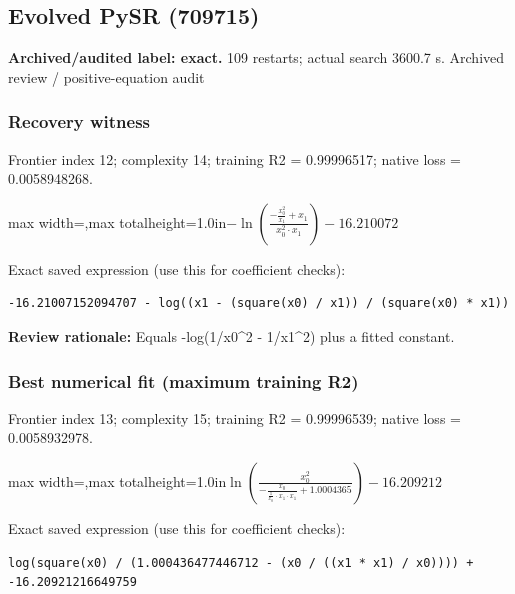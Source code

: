 \documentclass[10pt,letterpaper,landscape]{article}
\begin{document}
\begin{minipage}[t]{0.485\textwidth}
\subsection*{Evolved PySR (709715)}
\textbf{Archived/audited label: exact.} 109 restarts; actual search 3600.7 s.
{\small Archived review / positive-equation audit}
\subsubsection*{Recovery witness}
Frontier index 12; complexity 14; training R2 = 0.99996517; native loss = 0.0058948268.
\begin{center}\begin{adjustbox}{max width=\linewidth,max totalheight=1.0in}$\displaystyle - \ln{\left(\frac{- \frac{x_{0}^{2}}{x_{1}} + x_{1}}{x_{0}^{2} \cdot x_{1}} \right)} - 16.210072$\end{adjustbox}\end{center}
{\scriptsize Exact saved expression (use this for coefficient checks):}
\begin{lstlisting}
-16.21007152094707 - log((x1 - (square(x0) / x1)) / (square(x0) * x1))
\end{lstlisting}
{\small\textbf{Review rationale:} Equals -log(1/x0\textasciicircum{}2 - 1/x1\textasciicircum{}2) plus a fitted constant.}
\subsubsection*{Best numerical fit (maximum training R2)}
Frontier index 13; complexity 15; training R2 = 0.99996539; native loss = 0.0058932978.
\begin{center}\begin{adjustbox}{max width=\linewidth,max totalheight=1.0in}$\displaystyle \ln{\left(\frac{x_{0}^{2}}{- \frac{x_{0}}{\frac{1}{x_{0}} \cdot x_{1} \cdot x_{1}} + 1.0004365} \right)} - 16.209212$\end{adjustbox}\end{center}
{\scriptsize Exact saved expression (use this for coefficient checks):}
\begin{lstlisting}
log(square(x0) / (1.000436477446712 - (x0 / ((x1 * x1) / x0)))) + -16.20921216649759
\end{lstlisting}
\end{minipage}
\clearpage{}\label{rydberg-10006}
\end{document}
